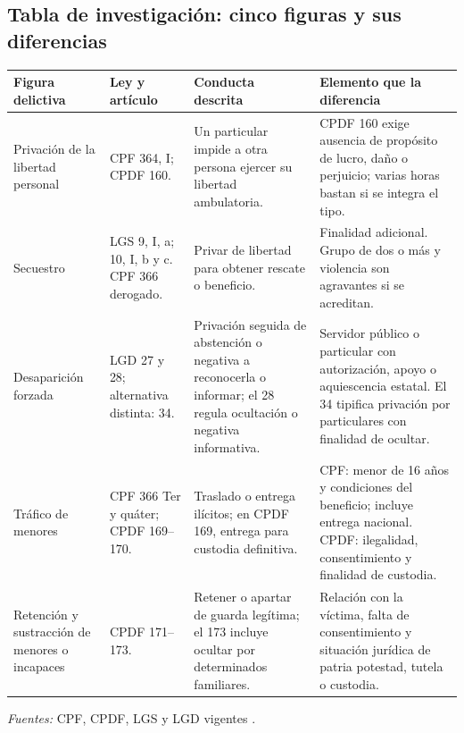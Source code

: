 \documentclass[spanish,letterpaper,oneside]{article}
\renewcommand{\arraystretch}{1.08}
\begin{document}
\subsection*{Tabla de investigación: cinco figuras y sus diferencias}
\begingroup\fontsize{10.3}{11.7}\selectfont
\renewcommand{\arraystretch}{1.12}
\begin{tabularx}{\linewidth}{@{}>{\raggedright\arraybackslash}p{2.5cm}>{\raggedright\arraybackslash}p{3.05cm}>{\raggedright\arraybackslash}X>{\raggedright\arraybackslash}X@{}}
\toprule
\textbf{Figura delictiva} & \textbf{Ley y artículo} & \textbf{Conducta descrita} & \textbf{Elemento que la diferencia} \\
\midrule
Privación de la libertad personal & CPF 364, I; CPDF 160. & Un particular impide a otra persona ejercer su libertad ambulatoria. & CPDF 160 exige ausencia de propósito de lucro, daño o perjuicio; varias horas bastan si se integra el tipo. \\
\midrule
Secuestro & LGS 9, I, a; 10, I, b y c. CPF 366 derogado. & Privar de libertad para obtener rescate o beneficio. & Finalidad adicional. Grupo de dos o más y violencia son agravantes si se acreditan. \\
\midrule
Desaparición forzada & LGD 27 y 28; alternativa distinta: 34. & Privación seguida de abstención o negativa a reconocerla o informar; el 28 regula ocultación o negativa informativa. & Servidor público o particular con autorización, apoyo o aquiescencia estatal. El 34 tipifica privación por particulares con finalidad de ocultar. \\
\midrule
Tráfico de menores & CPF 366 Ter y quáter; CPDF 169--170. & Traslado o entrega ilícitos; en CPDF 169, entrega para custodia definitiva. & CPF: menor de 16 años y condiciones del beneficio; incluye entrega nacional. CPDF: ilegalidad, consentimiento y finalidad de custodia. \\
\midrule
Retención y sustracción de menores o incapaces & CPDF 171--173. & Retener o apartar de guarda legítima; el 173 incluye ocultar por determinados familiares. & Relación con la víctima, falta de consentimiento y situación jurídica de patria potestad, tutela o custodia. \\
\bottomrule
\end{tabularx}
\par\vspace{2pt}\textit{Fuentes:} CPF, CPDF, LGS y LGD vigentes \citep{cpfS4Vigente,cpdfS4Vigente,secuestroS5,desaparicionS5}.
\endgroup
\end{document}
